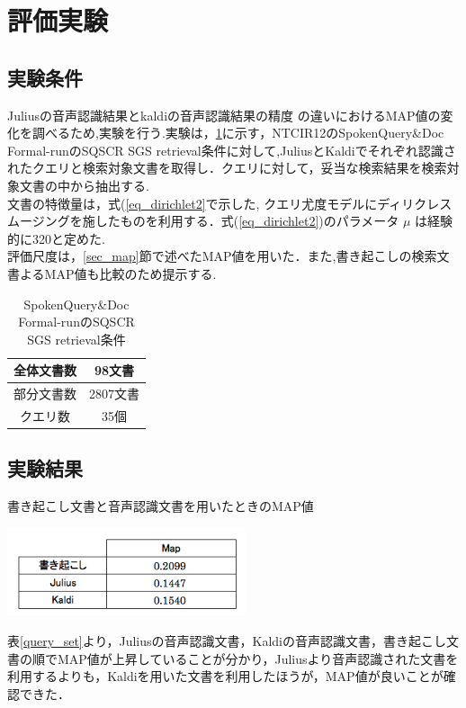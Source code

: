 \section{評価実験}
\subsection{実験条件}
Juliusの音声認識結果とkaldiの音声認識結果の精度
の違いにおけるMAP値の変化を調べるため,実験を行う.実験は，\ref{t_condition}に示す，NTCIR12のSpokenQuery\&Doc Formal-runのSQSCR SGS retrieval条件に対して,JuliusとKaldiでそれぞれ認識されたクエリと検索対象文書を取得し．クエリに対して，妥当な検索結果を検索対象文書の中から抽出する. \\文書の特徴量は，式(\ref{eq_dirichlet2}で示した, クエリ尤度モデルにディリクレスムージングを施したものを利用する．式(\ref{eq_dirichlet2})のパラメータ $\mu$ は経験的に320と定めた. \\ 
評価尺度は，\ref{sec_map}節で述べたMAP値を用いた．また,書き起こしの検索文書よるMAP値も比較のため提示する.

\begin{table}[htbp]
    \begin{center}
        \caption{SpokenQuery\&Doc Formal-runのSQSCR SGS retrieval条件}
        \begin{tabular}{|c|c|}
            \hline
            全体文書数 & 98文書 \\ \hline
            部分文書数 & 2807文書 \\ \hline
            クエリ数 & 35個 \\ \hline
        \end{tabular}
        \label{t_condition}
    \end{center}
\end{table}

\subsection{実験結果}

\begin{table}[htbp]
    \centering
    \caption{書き起こし文書と音声認識文書を用いたときのMAP値}
    \includegraphics[width=7cm]{./image/write_julius_kaldi.png}
    \label{query_set}
\end{table}

表\ref{query_set}より，Juliusの音声認識文書，Kaldiの音声認識文書，書き起こし文書の順でMAP値が上昇していることが分かり，Juliusより音声認識された文書を利用するよりも，Kaldiを用いた文書を利用したほうが，MAP値が良いことが確認できた．



